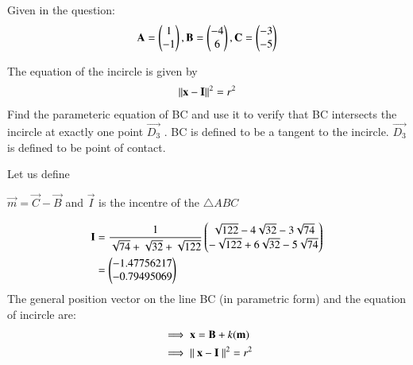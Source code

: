 \documentclass[journal,12pt,twocolumn]{IEEEtran}
\theoremstyle{remark}
\begin{document}


Given in the question:
  \begin{align}
    \mathbf{A} = \begin{pmatrix}1\\-1\end{pmatrix}  ,
    \mathbf{B} = \begin{pmatrix}-4\\6\end{pmatrix} ,
    \mathbf{C} = \begin{pmatrix}-3\\-5\end{pmatrix}\nonumber
    \end{align}

The equation of the incircle is given by
\begin{align}
\left\lVert\mathbf{x}-\mathbf{I}\right\rVert^2 = r^2
\end{align}
Find the parameteric equation of BC and use it to verify that BC
intersects the incircle at exactly one point $\vec{D_{3}}$ . BC is defined to be a
tangent to the incircle. $\vec{D_{3}}$ is defined to be point of contact. 

Let us define 

$\vec{m} = \vec{C}-\vec{B}$ and $\vec{I}$ is the incentre of the $\bigtriangleup ABC$

\begin{align}
\mathbf{I} &= \frac{1}{\sqrt{74}+\sqrt{32}+\sqrt{122}}\begin{pmatrix}{\sqrt{122}-4\sqrt{32}-3\sqrt{74}}\\{-\sqrt{122}+6\sqrt{32}-5\sqrt{74}}\end{pmatrix}\nonumber\\
&=\begin{pmatrix}-1.47756217 \\-0.79495069\end{pmatrix}
\end{align}
The general position vector on the line BC (in parametric form)  and the equation of incircle are:
\begin{align}
 &\implies \mathbf{x} = \mathbf{B} + k(\mathbf{m})\\
 &\implies \left\lVert\ \mathbf{x} - \mathbf{I}\ \right\rVert^2 = r^2 
\end{align}
\end{document}
